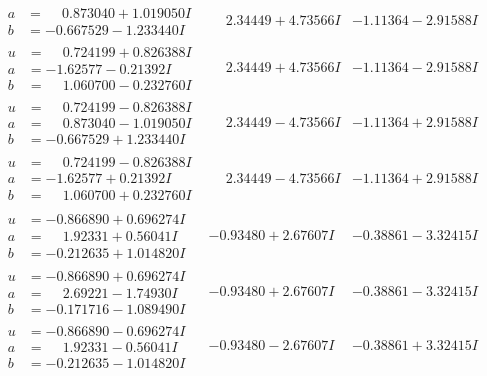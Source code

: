 \documentclass[1p]{elsarticle_modified}
\theoremstyle{definition}
\begin{document}
$$\begin{array}{c|c|c}
\begin{aligned}
a &= \phantom{-}0.873040 + 1.019050 I \\
b &= -0.667529 - 1.233440 I\end{aligned}
 & \phantom{-}2.34449 + 4.73566 I & -1.11364 - 2.91588 I \\ \hline\begin{aligned}
u &= \phantom{-}0.724199 + 0.826388 I \\
a &= -1.62577 - 0.21392 I \\
b &= \phantom{-}1.060700 - 0.232760 I\end{aligned}
 & \phantom{-}2.34449 + 4.73566 I & -1.11364 - 2.91588 I \\ \hline\begin{aligned}
u &= \phantom{-}0.724199 - 0.826388 I \\
a &= \phantom{-}0.873040 - 1.019050 I \\
b &= -0.667529 + 1.233440 I\end{aligned}
 & \phantom{-}2.34449 - 4.73566 I & -1.11364 + 2.91588 I \\ \hline\begin{aligned}
u &= \phantom{-}0.724199 - 0.826388 I \\
a &= -1.62577 + 0.21392 I \\
b &= \phantom{-}1.060700 + 0.232760 I\end{aligned}
 & \phantom{-}2.34449 - 4.73566 I & -1.11364 + 2.91588 I \\ \hline\begin{aligned}
u &= -0.866890 + 0.696274 I \\
a &= \phantom{-}1.92331 + 0.56041 I \\
b &= -0.212635 + 1.014820 I\end{aligned}
 & -0.93480 + 2.67607 I & -0.38861 - 3.32415 I \\ \hline\begin{aligned}
u &= -0.866890 + 0.696274 I \\
a &= \phantom{-}2.69221 - 1.74930 I \\
b &= -0.171716 - 1.089490 I\end{aligned}
 & -0.93480 + 2.67607 I & -0.38861 - 3.32415 I \\ \hline\begin{aligned}
u &= -0.866890 - 0.696274 I \\
a &= \phantom{-}1.92331 - 0.56041 I \\
b &= -0.212635 - 1.014820 I\end{aligned}
 & -0.93480 - 2.67607 I & -0.38861 + 3.32415 I \\ \hline\begin{aligned}

\end{aligned}
\end{array}$$
\end{document}
